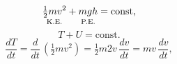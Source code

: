 \documentclass[12pt,preview]{standalone}
\newcommand{\ddt}[2]{\frac{d#1}{d#2}}
\begin{document}
\begin{preview}
    \begin{equation}
        \underset{\text{K.E.}}{\tfrac{1}{2}mv^2}+
        \underset{\text{P.E.}}{\vphantom{\tfrac{1}{2}}mgh}=\text{const},\notag
        \end{equation}
        \begin{equation}
        \label{Eq:I:13:1}
        T+U=\text{const}.
        \end{equation}
        \begin{equation}
        \label{Eq:I:13:2}
        \ddt{T}{t}=\ddt{}{t}\,(\tfrac{1}{2}mv^2)=
        \tfrac{1}{2}m2v\,\ddt{v}{t}=mv\,\ddt{v}{t},
    \end{equation}
\end{preview}
\end{document}
